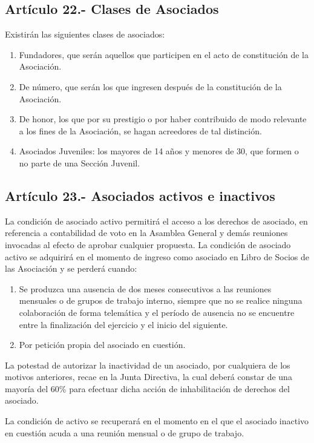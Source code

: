 \documentclass[12pt]{article}
\begin{document}
\subsection{Artículo 22.- Clases de Asociados}
Existirán las siguientes clases de asociados:
\begin{enumerate}[label=\alph*)]
    \item Fundadores, que serán aquellos que participen en el acto de constitución de la Asociación.
    \item De número, que serán los que ingresen después de la constitución de la Asociación.
    \item De honor, los que por su prestigio o por haber contribuido de modo relevante a los fines de la Asociación, se hagan acreedores de tal distinción.
    \item Asociados Juveniles: los mayores de 14 años y menores de 30, que formen o no parte de una Sección Juvenil.
\end{enumerate}

\subsection{Artículo 23.- Asociados activos e inactivos}
La condición de asociado activo permitirá el acceso a los derechos de asociado, en referencia a contabilidad de voto en la Asamblea General y demás reuniones invocadas al efecto de aprobar cualquier propuesta. La condición de asociado activo se adquirirá en el momento de ingreso como asociado en Libro de Socios de las Asociación y se perderá cuando:
\begin{enumerate}[label=\alph*)]
    \item Se produzca una ausencia de dos meses consecutivos a las reuniones mensuales o de grupos de trabajo interno, siempre que no se realice ninguna colaboración de forma telemática y el período de ausencia no se encuentre entre la finalización del ejercicio y el inicio del siguiente.
    \item Por petición propia del asociado en cuestión.
\end{enumerate}

La potestad de autorizar la inactividad de un asociado, por cualquiera de los motivos anteriores, recae en la Junta Directiva, la cual deberá constar de una mayoría del 60\% para efectuar dicha acción de inhabilitación de derechos del asociado.

La condición de activo se recuperará en el momento en el que el asociado inactivo en cuestión acuda a una reunión mensual o de grupo de trabajo.
\end{document}
